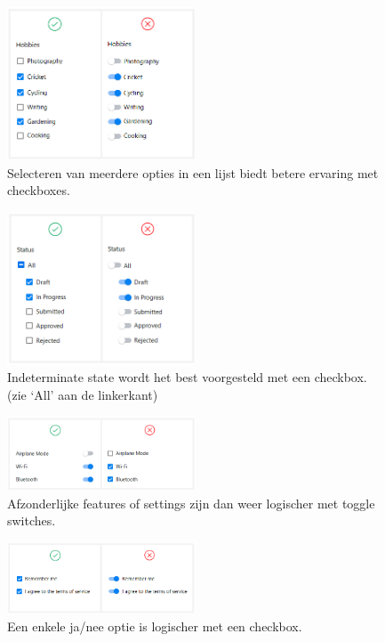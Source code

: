 \documentclass{article}
\begin{document}
\begin{figure}[H]
    \centering
    \includegraphics[width=0.5\textwidth]{toggle-ex-3.png}
    \caption{Selecteren van meerdere opties in een lijst biedt betere ervaring met checkboxes.}
\end{figure}

\begin{figure}[H]
    \centering
    \includegraphics[width=0.5\textwidth]{toggle-ex-4.png}
    \caption{Indeterminate state wordt het best voorgesteld met een checkbox. (zie `All' aan de linkerkant)}
\end{figure}

\begin{figure}[H]
    \centering
    \includegraphics[width=0.5\textwidth]{toggle-ex-5.png}
    \caption{Afzonderlijke features of settings zijn dan weer logischer met toggle switches.}
\end{figure}

\begin{figure}[H]
    \centering
    \includegraphics[width=0.5\textwidth]{toggle-ex-6.png}
    \caption{Een enkele ja/nee optie is logischer met een checkbox.}
\end{figure}
\end{document}
